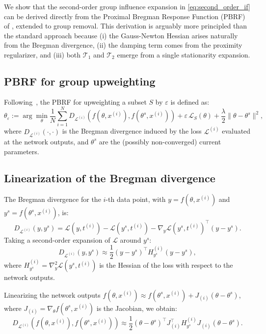 \documentclass{article}
\theoremstyle{plain}
\theoremstyle{definition}
\theoremstyle{remark}
\begin{document}
We show that the second-order group influence expansion in \cref{eq:second_order_if}
can be derived directly from the Proximal Bregman Response Function (PBRF) of \citet{bae2022if},
extended to group removal.
This derivation is arguably more principled than the standard approach because
(i) the Gauss-Newton Hessian arises naturally from the Bregman divergence,
(ii) the damping term comes from the proximity regularizer, and
(iii) both $\mathcal{T}_1$ and $\mathcal{T}_2$ emerge from a single stationarity expansion.

\subsection{PBRF for group upweighting}

Following~\citet{bae2022if}, the PBRF for upweighting a subset $S$ by $\varepsilon$ is defined as:
\begin{equation}
\theta_\varepsilon := \arg\min_{\theta}
\frac{1}{N}\sum_{i=1}^{N} D_{\mathcal{L}^{(i)}}(f(\theta, x^{(i)}), f(\theta^s, x^{(i)}))
+ \varepsilon\,\mathcal{L}_S(\theta)
+ \frac{\lambda}{2}\|\theta - \theta^s\|^2,
\label{eq:pbrf_group}
\end{equation}
where $D_{\mathcal{L}^{(i)}}(\cdot,\cdot)$ is the Bregman divergence induced by the loss $\mathcal{L}^{(i)}$
evaluated at the network outputs, and $\theta^s$ are the (possibly non-converged) current parameters.

\subsection{Linearization of the Bregman divergence}

The Bregman divergence for the $i$-th data point, with $y = f(\theta, x^{(i)})$ and $y^s = f(\theta^s, x^{(i)})$, is:
\[
D_{\mathcal{L}^{(i)}}(y, y^s) = \mathcal{L}(y, t^{(i)}) - \mathcal{L}(y^s, t^{(i)}) - \nabla_y \mathcal{L}(y^s, t^{(i)})^\top (y - y^s).
\]
Taking a second-order expansion of $\mathcal{L}$ around $y^s$:
\[
D_{\mathcal{L}^{(i)}}(y, y^s) \approx \frac{1}{2}(y - y^s)^\top H_{y^s}^{(i)} (y - y^s),
\]
where $H_{y^s}^{(i)} = \nabla_y^2 \mathcal{L}(y^s, t^{(i)})$ is the Hessian of the loss with respect to the network outputs.

Linearizing the network outputs $f(\theta, x^{(i)}) \approx f(\theta^s, x^{(i)}) + J_{(i)}(\theta - \theta^s)$,
where $J_{(i)} = \nabla_\theta f(\theta^s, x^{(i)})$ is the Jacobian, we obtain:
\[
D_{\mathcal{L}^{(i)}}(f(\theta, x^{(i)}), f(\theta^s, x^{(i)}))
\approx \frac{1}{2}(\theta - \theta^s)^\top J_{(i)}^\top H_{y^s}^{(i)} J_{(i)} (\theta - \theta^s).
\]
\end{document}
